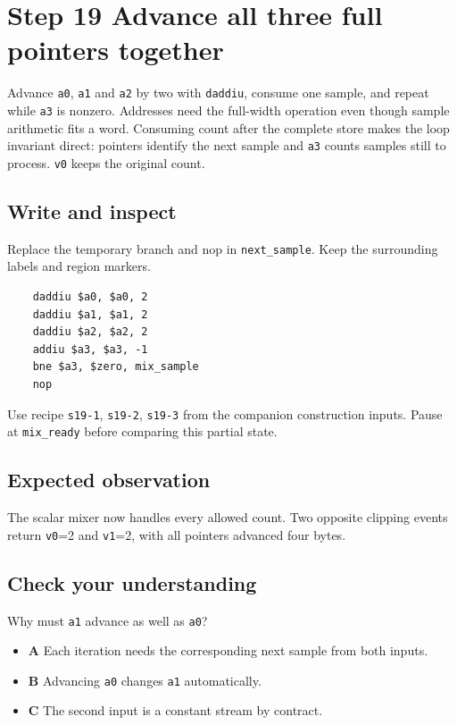 \section{Step 19 Advance all three full pointers together}\label{pcm-s19}

Advance \texttt{a0}, \texttt{a1} and \texttt{a2} by two with \texttt{daddiu}, consume one sample, and repeat while \texttt{a3} is nonzero. Addresses need the full-width operation even though sample arithmetic fits a word. Consuming count after the complete store makes the loop invariant direct: pointers identify the next sample and \texttt{a3} counts samples still to process. \texttt{v0} keeps the original count.

\subsection{Write and inspect}
Replace the temporary branch and nop in \texttt{next\_sample}. Keep the surrounding labels and region markers.

\begin{verbatim}
    daddiu $a0, $a0, 2
    daddiu $a1, $a1, 2
    daddiu $a2, $a2, 2
    addiu $a3, $a3, -1
    bne $a3, $zero, mix_sample
    nop
\end{verbatim}
Use recipe \texttt{s19-1}, \texttt{s19-2}, \texttt{s19-3} from the companion construction inputs. Pause at \texttt{mix\_ready} before comparing this partial state.

\subsection{Expected observation}
The scalar mixer now handles every allowed count. Two opposite clipping events return \texttt{v0}=2 and \texttt{v1}=2, with all pointers advanced four bytes.

\subsection{Check your understanding}
Why must \texttt{a1} advance as well as \texttt{a0}?

\begin{itemize}
  \item \textbf{A} Each iteration needs the corresponding next sample from both inputs.
  \item \textbf{B} Advancing \texttt{a0} changes \texttt{a1} automatically.
  \item \textbf{C} The second input is a constant stream by contract.
\end{itemize}
